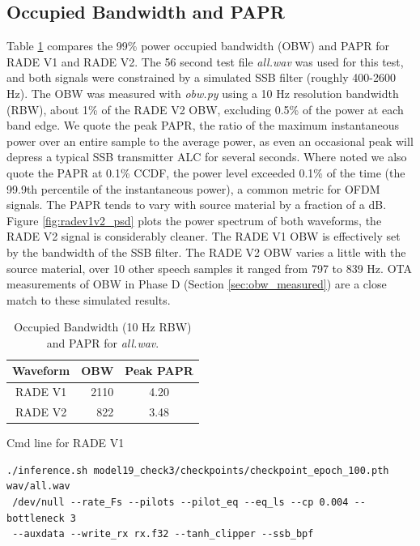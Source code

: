 \documentclass{article}
\begin{document}
\subsection{Occupied Bandwidth and PAPR}

Table \ref{tab:obw_papr} compares the 99\% power occupied bandwidth (OBW) and PAPR for RADE V1 and RADE V2.  The 56 second test file \emph{all.wav} was used for this test, and both signals were constrained by a simulated SSB filter (roughly 400-2600 \si{Hz}).  The OBW was measured with \emph{obw.py} using a 10 \si{Hz} resolution bandwidth (RBW), about 1\% of the RADE V2 OBW, excluding 0.5\% of the power at each band edge.  We quote the peak PAPR, the ratio of the maximum instantaneous power over an entire sample to the average power, as even an occasional peak will depress a typical SSB transmitter ALC for several seconds.  Where noted we also quote the PAPR at 0.1\% CCDF, the power level exceeded 0.1\% of the time (the 99.9th percentile of the instantaneous power), a common metric for OFDM signals.  The PAPR tends to vary with source material by a fraction of a \si{dB}.  Figure \ref{fig:radev1v2_psd} plots the power spectrum of both waveforms, the RADE V2 signal is considerably cleaner.  The RADE V1 OBW is effectively set by the bandwidth of the SSB filter.  The RADE V2 OBW varies a little with the source material, over 10 other speech samples it ranged from 797 to 839 \si{Hz}.  OTA measurements of OBW in Phase D (Section \ref{sec:obw_measured}) are a close match to these simulated results.

\begin{table} [h]
\caption{Occupied Bandwidth (10 \si{Hz} RBW) and PAPR for \emph{all.wav}.}
\label{tab:obw_papr}
\centering
\begin{tabular}{ c |  r | c }
 \hline
 Waveform & OBW & Peak PAPR \\
 \hline
 RADE V1 & 2110 & 4.20  \\
 RADE V2 & 822 & 3.48 \\
 \hline
\end{tabular}
\end{table}

\noindent Cmd line for RADE V1

\begin{verbatim}
./inference.sh model19_check3/checkpoints/checkpoint_epoch_100.pth wav/all.wav
 /dev/null --rate_Fs --pilots --pilot_eq --eq_ls --cp 0.004 --bottleneck 3 
 --auxdata --write_rx rx.f32 --tanh_clipper --ssb_bpf
\end{verbatim}
\end{document}

